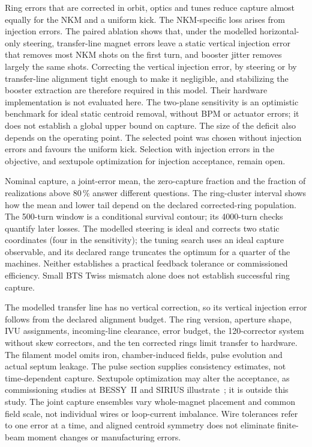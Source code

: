 \documentclass[aps,prab,reprint,amsmath,amssymb,floatfix,longbibliography]{revtex4-2}
\begin{document}
Ring errors that are corrected in orbit, optics and tunes reduce capture almost equally for the NKM and a uniform kick. The NKM-specific loss arises from injection errors. The paired ablation shows that, under the modelled horizontal-only steering, transfer-line magnet errors leave a static vertical injection error that removes most NKM shots on the first turn, and booster jitter removes largely the same shots. Correcting the vertical injection error, by steering or by transfer-line alignment tight enough to make it negligible, and stabilizing the booster extraction are therefore required in this model. Their hardware implementation is not evaluated here. The two-plane sensitivity is an optimistic benchmark for ideal static centroid removal, without BPM or actuator errors; it does not establish a global upper bound on capture. The size of the deficit also depends on the operating point. The selected point was chosen without injection errors and favours the uniform kick. Selection with injection errors in the objective, and sextupole optimization for injection acceptance, remain open.

Nominal capture, a joint-error mean, the zero-capture fraction and the fraction of realizations above 80\,\% answer different questions. The ring-cluster interval shows how the mean and lower tail depend on the declared corrected-ring population. The 500-turn window is a conditional survival contour; its 4000-turn checks quantify later losses. The modelled steering is ideal and corrects two static coordinates (four in the sensitivity); the tuning search uses an ideal capture observable, and its declared range truncates the optimum for a quarter of the machines. Neither establishes a practical feedback tolerance or commissioned efficiency. Small BTS Twiss mismatch alone does not establish successful ring capture.

The modelled transfer line has no vertical correction, so its vertical injection error follows from the declared alignment budget. The ring version, aperture shape, IVU assignments, incoming-line clearance, error budget, the 120-corrector system without skew correctors, and the ten corrected rings limit transfer to hardware. The filament model omits iron, chamber-induced fields, pulse evolution and actual septum leakage. The pulse section supplies consistency estimates, not time-dependent capture. Sextupole optimization may alter the acceptance, as commissioning studies at BESSY~II and SIRIUS illustrate~\cite{Gora2023,Velloso2023}; it is outside this study. The joint capture ensembles vary whole-magnet placement and common field scale, not individual wires or loop-current imbalance. Wire tolerances refer to one error at a time, and aligned centroid symmetry does not eliminate finite-beam moment changes or manufacturing errors.
\end{document}
